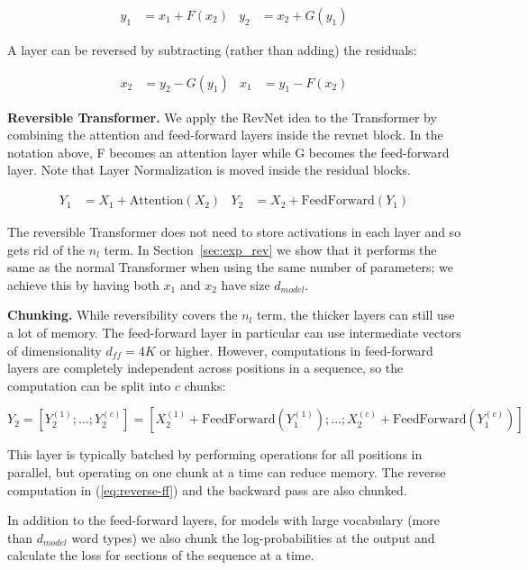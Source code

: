 \begin{align}
    y_1 &= x_1 + F(x_2) & y_2 &= x_2 + G(y_1)
\end{align}

A layer can be reversed by subtracting (rather than adding) the residuals:

\begin{align}\label{eq:reverse-ff}
    x_2 &= y_2 - G(y_1) & x_1 &= y_1 - F(x_2)
\end{align}

\textbf{Reversible Transformer.} We apply the RevNet idea to the Transformer by combining the attention and feed-forward layers inside the revnet block. In the notation above, F becomes an attention layer while G becomes the feed-forward layer. Note that Layer Normalization \citep{layernorm2016} is moved inside the residual blocks.

\begin{align}
    Y_1 &= X_1 + \mathrm{Attention}(X_2) & Y_2 &= X_2 + \mathrm{FeedForward}(Y_1)

\end{align}

The reversible Transformer does not need to store activations in each layer and so gets rid of the $n_l$ term.  In Section~\ref{sec:exp_rev} we show that it performs the same as the normal Transformer when using  the same number of parameters; we achieve this by having both $x_1$ and $x_2$ have size $d_{model}$.

\textbf{Chunking.}
While reversibility covers the $n_l$ term, the thicker layers can still use a lot of memory. The feed-forward layer in particular can use intermediate vectors of dimensionality $d_{ff}=4K$ or higher. However, computations in feed-forward layers are completely independent across positions in a sequence, so the computation can be split into $c$ chunks:

\begin{equation}
    Y_2 = \left[Y_2^{(1)}; \ldots; Y_2^{(c)}\right] = \left[X_2^{(1)} + \mathrm{FeedForward}(Y_1^{(1)}); \ldots; X_2^{(c)} + \mathrm{FeedForward}(Y_1^{(c)})\right]
\end{equation}

This layer is typically batched by performing operations for all positions in parallel, but operating on one chunk at a time can reduce memory. The reverse computation in (\ref{eq:reverse-ff}) and the backward pass are also chunked.

In addition to the feed-forward layers, for models with large vocabulary (more than $d_{model}$ word types) we also chunk the log-probabilities at the output and calculate the loss for sections of the sequence at a time.

